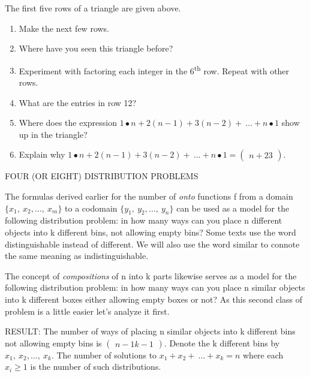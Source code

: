 \documentclass[10pt,letter]{article}
\begin{document}
The first five rows of a triangle are given above.
\begin{enumerate}
\def\labelenumi{\arabic{enumi}.}

\item
  Make the next few rows.
\item
  Where have you seen this triangle before?
\item
  Experiment with factoring each integer in the 6\textsuperscript{th}
  row. Repeat with other rows.
\item
  What are the entries in row 12?
\item
  Where does the expression
  \(1 \bullet n + 2\left( n - 1 \right) + 3\left( n - 2 \right) + \ \ldots + n \bullet 1\)
  show up in the triangle?
\item
  Explain why
  \(1 \bullet n + 2\left( n - 1 \right) + 3\left( n - 2 \right) + \ \ldots + n \bullet 1 =
\begin{pmatrix}
  n + 2
  3
  \end{pmatrix}
\).

\end{enumerate}

FOUR (OR EIGHT) DISTRIBUTION PROBLEMS

The formulas derived earlier for the number of \emph{onto} functions f
from a domain \(\{ x_{1},\ x_{2},\ldots,\ x_{m}\}\) to a codomain
\(\{ y_{1},\ y_{2},\ldots,\ y_{n}\}\) can be used as a model for the
following distribution problem: in how many ways can you place n
different objects into k different bins, not allowing empty bins? Some
texts use the word distinguishable instead of different. We will also
use the word similar to connote the same meaning as indistinguishable.

The concept of \emph{compositions} of n into k parts likewise serves as
a model for the following distribution problem: in how many ways can you
place n similar objects into k different boxes either allowing empty
boxes or not? As this second class of problem is a little easier let's
analyze it first.

RESULT: The number of ways of placing n similar objects into k different
bins not allowing empty bins is \(\begin{pmatrix}
n - 1
k - 1
\end{pmatrix}
\). Denote the k different bins by
\(x_{1},\ x_{2},\ldots,\ x_{k}\). The number of solutions to
\(x_{1} + x_{2} + \ \ldots + x_{k} = n\) where each \(x_{i} \geq 1\) is
the number of such distributions.
\end{document}
